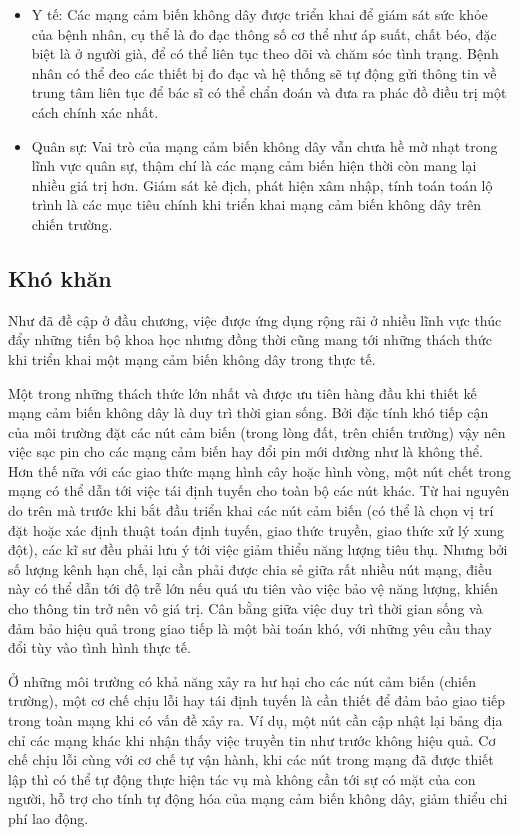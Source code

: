 \documentclass{hust}
\begin{document}
\begin{itemize}
	\item Y tế: Các mạng cảm biến không dây được triển khai để giám sát sức khỏe của bệnh nhân, cụ thể là đo đạc thông số cơ thể như áp suất, chất béo, đặc biệt là ở người già, để có thể liên tục theo dõi và chăm sóc tình trạng. Bệnh nhân có thể đeo các thiết bị đo đạc và hệ thống sẽ tự động gửi thông tin về trung tâm liên tục để bác sĩ có thể chẩn đoán và đưa ra phác đồ điều trị một cách chính xác nhất.
	\item Quân sự: Vai trò của mạng cảm biến không dây vẫn chưa hề mờ nhạt trong lĩnh vực quân sự, thậm chí là các mạng cảm biến hiện thời còn mang lại nhiều giá trị hơn. Giám sát kẻ địch, phát hiện xâm nhập, tính toán toán lộ trình là các mục tiêu chính khi triển khai mạng cảm biến không dây trên chiến trường.
\end{itemize}

\subsection{Khó khăn}
Như đã đề cập ở đầu chương, việc được ứng dụng rộng rãi ở nhiều lĩnh vực thúc đẩy những tiến bộ khoa học nhưng đồng thời cũng mang tới những thách thức khi triển khai một mạng cảm biến không dây trong thực tế. \cite{eisa2013challenges}


Một trong những thách thức lớn nhất và được ưu tiên hàng đầu khi thiết kế mạng cảm biến không dây là duy trì thời gian sống. Bởi đặc tính khó tiếp cận của môi trường đặt các nút cảm biến (trong lòng đất, trên chiến trường) vậy nên việc sạc pin cho các mạng cảm biến hay đổi pin mới dường như là không thể. Hơn thế nữa với các giao thức mạng hình cây hoặc hình vòng, một nút chết trong mạng có thể dẫn tới việc tái định tuyến cho toàn bộ các nút khác. Từ hai nguyên do trên mà trước khi bắt đầu triển khai các nút cảm biến (có thể là chọn vị trí đặt hoặc xác định thuật toán định tuyến, giao thức truyền, giao thức xử lý xung đột), các kĩ sư đều phải lưu ý tới việc giảm thiểu năng lượng tiêu thụ. Nhưng bởi số lượng kênh hạn chế, lại cần phải được chia sẻ giữa rất nhiều nút mạng, điều này có thể dẫn tới độ trễ lớn nếu quá ưu tiên vào việc bảo vệ năng lượng, khiến cho thông tin trở nên vô giá trị. Cân bằng giữa việc duy trì thời gian sống và đảm bảo hiệu quả trong giao tiếp là một bài toán khó, với những yêu cầu thay đổi tùy vào tình hình thực tế.


Ở những môi trường có khả năng xảy ra hư hại cho các nút cảm biến (chiến trường), một cơ chế chịu lỗi hay tái định tuyến là cần thiết để đảm bảo giao tiếp trong toàn mạng khi có vấn đề xảy ra. Ví dụ, một nút cần cập nhật lại bảng địa chỉ các mạng khác khi nhận thấy việc truyền tin như trước không hiệu quả. Cơ chế chịu lỗi cùng với cơ chế tự vận hành, khi các nút trong mạng đã được thiết lập thì có thể tự động thực hiện tác vụ mà không cần tới sự có mặt của con người, hỗ trợ cho tính tự động hóa của mạng cảm biến không dây, giảm thiểu chi phí lao động.
\end{document}
